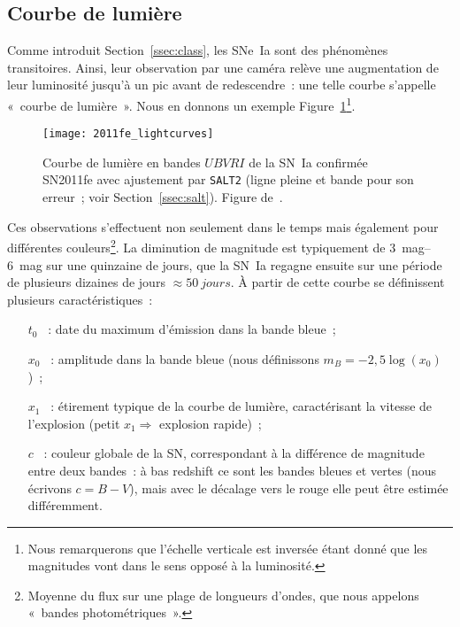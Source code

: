 \documentclass[../main/main.tex]{subfiles}
\begin{document}
\subsection{Courbe de lumière}\label{ssec:lc}

Comme introduit Section~\ref{ssec:class}, les SNe~Ia sont des phénomènes
transitoires. Ainsi, leur observation par une caméra relève une augmentation de
leur luminosité jusqu'à un pic avant de redescendre~: une telle courbe s'appelle
«~courbe de lumière~». Nous en donnons un exemple
Figure~\ref{fig:2011fe_phot}\footnote{Nous remarquerons que l'échelle verticale
    est inversée étant donné que les magnitudes vont dans le sens opposé à la
luminosité.}.

\begin{figure}[]
    \centering
    \texttt{[image: 2011fe\_lightcurves]}
    \caption[Courbe de lumière de la SN~Ia SN2011fe]{Courbe de lumière en bandes
        $UBVRI$ de la SN~Ia confirmée SN2011fe avec ajustement par
        \texttt{SALT2} (ligne pleine et bande pour son erreur~;
        voir Section~\ref{ssec:salt}). Figure
    de~\cite{pereira2013}.}\label{fig:2011fe_phot}
\end{figure}

Ces observations s'effectuent non seulement dans le temps mais également pour
différentes couleurs\footnote{Moyenne du flux sur une plage de longueurs
d'ondes, que nous appelons «~bandes photométriques~».}. La diminution de magnitude
est typiquement de \SIrange{3}{6}{mag} sur une quinzaine de jours, que la SN~Ia
regagne ensuite sur une période de plusieurs dizaines de jours $\approx
\SI{50}{jours}$. À partir de cette courbe se définissent plusieurs
caractéristiques~:

\begin{itemize}
    \item[$t_0$]~: date du maximum d'émission dans la bande bleue~;
    \item[$x_0$]~: amplitude dans la bande bleue (nous définissons $m_B =
        -2,5\log(x_0)$)~;
    \item[$x_1$]~: étirement typique de la courbe de lumière, caractérisant la
        vitesse de l'explosion (petit $x_1 \Rightarrow$ explosion rapide)~;
    \item[$c$]~: couleur globale de la SN, correspondant à la différence de
        magnitude entre deux bandes~: à bas redshift ce sont les bandes bleues
        et vertes (nous écrivons $c = B - V$), mais avec le décalage vers le
        rouge elle peut être estimée différemment.
\end{itemize}
\end{document}
